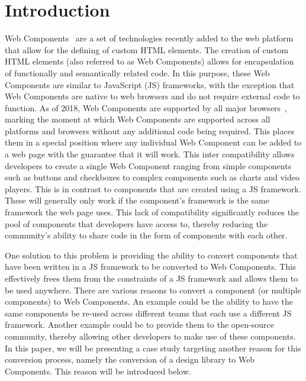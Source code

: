 \chapter{Introduction}
Web Components~ are a set of technologies recently added to the web platform that allow for the defining of custom HTML elements. The creation of custom HTML elements (also referred to as Web Components) allows for encapsulation of functionally and semantically related code. In this purpose, these Web Components are similar to JavaScript (JS) frameworks, with the exception that Web Components are native to web browsers and do not require external code to function. As of 2018, Web Components are supported by all major browsers~, marking the moment at which Web Components are supported across all platforms and browsers without any additional code being required. This places them in a special position where any individual Web Component can be added to a web page with the guarantee that it will work. This inter compatibility allows developers to create a single Web Component ranging from simple components such as buttons and checkboxes to complex components such as charts and video players. This is in contrast to components that are created using a JS framework. These will generally only work if the component's framework is the same framework the web page uses. This lack of compatibility significantly reduces the pool of components that developers have access to, thereby reducing the community's ability to share code in the form of components with each other.

One solution to this problem is providing the ability to convert components that have been written in a JS framework to be converted to Web Components. This effectively frees them from the constraints of a JS framework and allows them to be used anywhere. There are various reasons to convert a component (or multiple components) to Web Components. An example could be the ability to have the same components be re-used across different teams that each use a different JS framework. Another example could be to provide them to the open-source community, thereby allowing other developers to make use of these components. In this paper, we will be presenting a case study targeting another reason for this conversion process, namely the conversion of a design library to Web Components. This reason will be introduced below.

